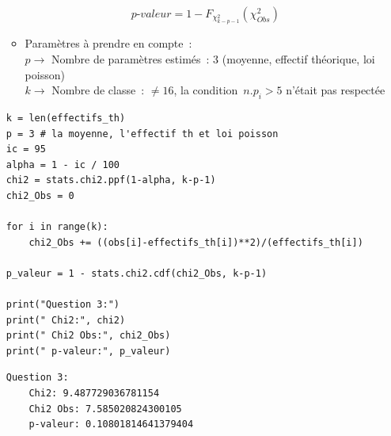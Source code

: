 \begin{enumerate}
\begin{itemize}
            \begin{equation}
                \textit{p-valeur} = 1 - F_{\chi^{2}_{k-p-1}}(\chi^{2}_{Obs})
            \end{equation}
        
        \item Paramètres à prendre en compte~: \\
            \hspace*{1cm}$p \to$ Nombre de paramètres estimés~: 3 (moyenne, effectif théorique, loi poisson) \\
            \hspace*{1cm}$k \to$ Nombre de classe~: $\neq 16$, la condition~$n.p_{i} > 5$ n'était pas respectée

        
    \end{itemize}
        \vspace{.2cm}

\begin{lstlisting}[style=myPython, caption=Code Python question 3, frame=lines]
k = len(effectifs_th)
p = 3 # la moyenne, l'effectif th et loi poisson
ic = 95
alpha = 1 - ic / 100
chi2 = stats.chi2.ppf(1-alpha, k-p-1)
chi2_Obs = 0

for i in range(k):
    chi2_Obs += ((obs[i]-effectifs_th[i])**2)/(effectifs_th[i])

p_valeur = 1 - stats.chi2.cdf(chi2_Obs, k-p-1)

print("Question 3:")
print(" Chi2:", chi2)
print(" Chi2 Obs:", chi2_Obs)
print(" p-valeur:", p_valeur)
\end{lstlisting}

\begin{lstlisting}[style=myLog, caption=Résultat du code, frame=lines]
Question 3:
    Chi2: 9.487729036781154
    Chi2 Obs: 7.585020824300105
    p-valeur: 0.10801814641379404
\end{lstlisting}



\end{enumerate}
